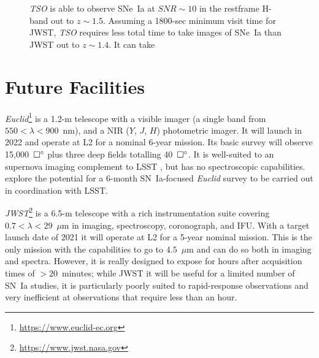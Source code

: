 \documentclass[12pt,preprint]{aastex}
\newcommand{\snia}{SN~Ia\xspace}
\newcommand{\sneia}{SNe~Ia\xspace}
\begin{document}


\begin{figure}[t]
\caption{{\it TSO} is able to observe \sneia at $SNR\sim10$ in the restframe H-band out to $z\sim1.5$.  Assuming a 1800-sec minimum visit time for JWST, {\it TSO} requires less total time to take images of \sneia than JWST out to $z\sim1.4$.  It can take
    \label{fig:tso_jwst}
}
\end{figure}

\section{Future Facilities}

{\it Euclid}\footnote{\url{https://www.euclid-ec.org}} is a 1.2-m telescope with a visible imager (a single band from $550<\lambda<900$~nm), and a NIR ($Y$, $J$, $H$) photometric imager.  It will launch in 2022 and operate at L2 for a nominal 6-year mission.  Its basic survey will observe 15,000~$\square\mbox{$^\circ$}$ plus three deep fields totalling 40~$\square\mbox{$^\circ$}$.  It is well-suited to an supernova imaging complement to LSST \citep{Astier14}, but has no spectroscopic capabilities.  \citet{Astier14} explore the potential for a 6-month \snia-focused {\it Euclid} survey to be carried out in coordination with LSST.

{\it JWST}\footnote{\url{https://www.jwst.nasa.gov}} is a 6.5-m telescope with a rich instrumentation suite covering $0.7<\lambda<29$~$\mu$m in imaging, spectroscopy, coronograph, and IFU.  With a target launch date of 2021 it will operate at L2 for a 5-year nominal mission.  This is the only mission with the capabilities to go to $4.5$~$\mu$m and can do so both in imaging and spectra.  However, it is really designed to expose for hours after acquisition times of $>20$~minutes; while JWST it will be useful for a limited number of \snia studies, it is particularly poorly suited to rapid-response observations and very inefficient at observations that require less than an hour.
\end{document}
